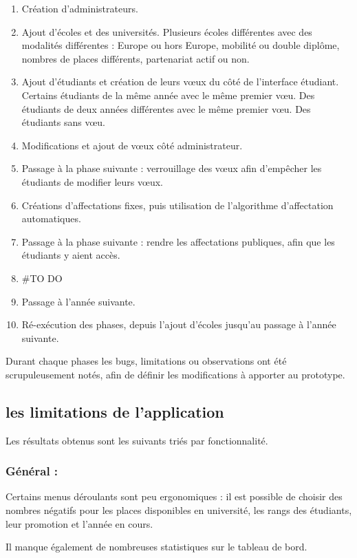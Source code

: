 \begin{enumerate}
\item Création d'administrateurs.
\item Ajout d'écoles et des universités. Plusieurs écoles différentes avec des modalités différentes : Europe ou hors Europe, mobilité ou double diplôme, nombres de places différents, partenariat actif ou non.
\item Ajout d'étudiants et création de leurs vœux du côté de l'interface étudiant. Certains étudiants de la même année avec le même premier vœu. Des étudiants de deux années différentes avec le même premier vœu. Des étudiants sans vœu.
\item Modifications et ajout de vœux côté administrateur.
\item Passage à la phase suivante : verrouillage des vœux afin d'empêcher les étudiants de modifier leurs vœux.
\item Créations d'affectations fixes, puis utilisation de l'algorithme d'affectation automatiques.
\item Passage à la phase suivante : rendre les affectations publiques, afin que les étudiants y aient accès.
\item #TO DO
\item Passage à l'année suivante.
\item Ré-exécution des phases, depuis l'ajout d'écoles jusqu'au passage à l'année suivante.
\end{enumerate}


Durant chaque phases les bugs, limitations ou observations ont été scrupuleusement notés, afin de définir les modifications à apporter au prototype.


\subsection{les limitations de l'application}

Les résultats obtenus sont les suivants triés par fonctionnalité.

\subsubsection{Général :}
Certains menus déroulants sont peu ergonomiques : il est possible de choisir des nombres négatifs pour les places disponibles en université, les rangs des étudiants, leur promotion et l'année en cours.

Il manque également de nombreuses statistiques sur le tableau de bord.

